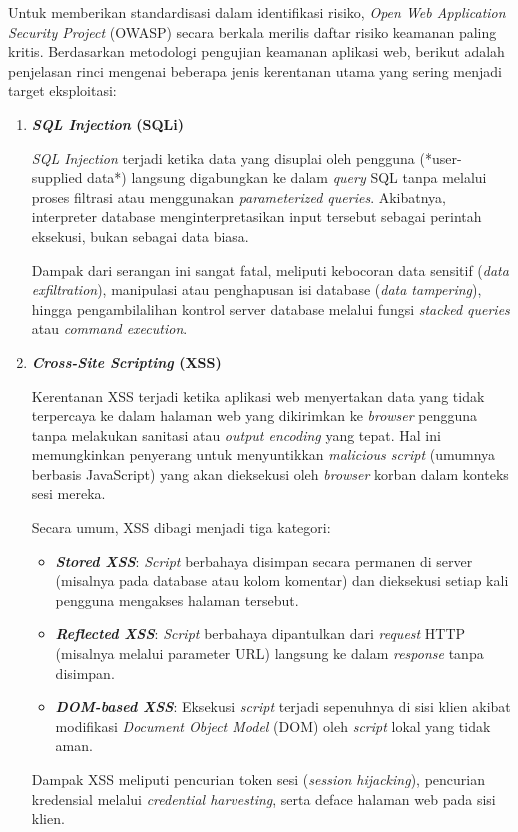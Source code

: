 Untuk memberikan standardisasi dalam identifikasi risiko, \textit{Open Web Application Security Project} (OWASP) secara berkala merilis daftar risiko keamanan paling kritis. Berdasarkan metodologi pengujian keamanan aplikasi web, berikut adalah penjelasan rinci mengenai beberapa jenis kerentanan utama yang sering menjadi target eksploitasi:

\begin{enumerate}
    \item \textbf{\textit{SQL Injection} (SQLi)}
    
    \textit{SQL Injection} terjadi ketika data yang disuplai oleh pengguna (*user-supplied data*) langsung digabungkan ke dalam \textit{query} SQL tanpa melalui proses filtrasi atau menggunakan \textit{parameterized queries}. Akibatnya, interpreter database menginterpretasikan input tersebut sebagai perintah eksekusi, bukan sebagai data biasa. 
    
    
    
    Dampak dari serangan ini sangat fatal, meliputi kebocoran data sensitif (\textit{data exfiltration}), manipulasi atau penghapusan isi database (\textit{data tampering}), hingga pengambilalihan kontrol server database melalui fungsi \textit{stacked queries} atau \textit{command execution}.

    \item \textbf{\textit{Cross-Site Scripting} (XSS)}
    
    Kerentanan XSS terjadi ketika aplikasi web menyertakan data yang tidak terpercaya ke dalam halaman web yang dikirimkan ke \textit{browser} pengguna tanpa melakukan sanitasi atau \textit{output encoding} yang tepat. Hal ini memungkinkan penyerang untuk menyuntikkan \textit{malicious script} (umumnya berbasis JavaScript) yang akan dieksekusi oleh \textit{browser} korban dalam konteks sesi mereka. 
    
    
    
    Secara umum, XSS dibagi menjadi tiga kategori:
    \begin{itemize}
        \item \textbf{\textit{Stored XSS}}: \textit{Script} berbahaya disimpan secara permanen di server (misalnya pada database atau kolom komentar) dan dieksekusi setiap kali pengguna mengakses halaman tersebut.
        \item \textbf{\textit{Reflected XSS}}: \textit{Script} berbahaya dipantulkan dari \textit{request} HTTP (misalnya melalui parameter URL) langsung ke dalam \textit{response} tanpa disimpan.
        \item \textbf{\textit{DOM-based XSS}}: Eksekusi \textit{script} terjadi sepenuhnya di sisi klien akibat modifikasi \textit{Document Object Model} (DOM) oleh \textit{script} lokal yang tidak aman.
    \end{itemize}
    Dampak XSS meliputi pencurian token sesi (\textit{session hijacking}), pencurian kredensial melalui \textit{credential harvesting}, serta deface halaman web pada sisi klien.


\end{enumerate}
